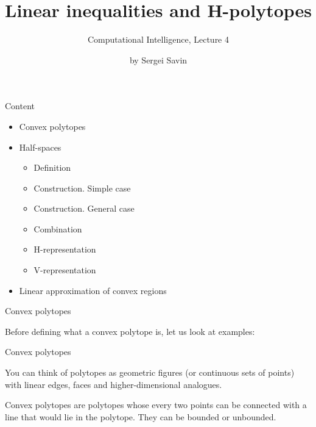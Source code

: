 \documentclass{beamer}
\title{Linear inequalities and H-polytopes}
\subtitle{Computational Intelligence, Lecture 4}
\author{by Sergei Savin}
\date{\mydate}
\begin{document}
\maketitle


\begin{frame}{Content}

\begin{itemize}
\item Convex polytopes
\item Half-spaces
\begin{itemize}
\item Definition
\item Construction. Simple case
\item Construction. General case
\item Combination
\item H-representation
\item V-representation
\end{itemize}
\item Linear approximation of convex regions
\end{itemize}

\end{frame}



\begin{frame}{Convex polytopes}
\begin{flushleft}

Before defining what a convex polytope is, let us look at examples:


 
\end{flushleft}
\end{frame}


\begin{frame}{Convex polytopes}
\begin{flushleft}

You can think of polytopes as geometric figures (or continuous sets of points) with linear edges, faces and higher-dimensional analogues.

\bigskip

\begin{definition}
 Convex polytopes are polytopes whose every two points can be connected with a line that would lie in the polytope. They can be bounded or unbounded.
\end{definition}
 
\end{flushleft}
\end{frame}
\end{document}
